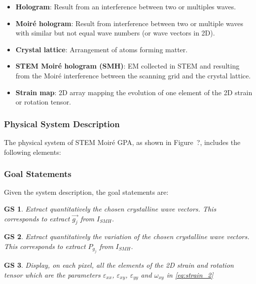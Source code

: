 \documentclass[12pt]{article}
\newcommand{\progname}{STEM Moir{\'e} GPA}
\newtheorem{GS}{GS}
\begin{document}
\begin{itemize}
\item \textbf{Hologram}: Result from an interference between two or multiples waves. 
\item \textbf{Moir{\'e} hologram}: Result from interference between two or multiple waves with similar but not equal wave numbers (or wave vectors in 2D).
\item \textbf{Crystal lattice}: Arrangement of atoms forming matter.
\item \textbf{STEM Moir{\'e} hologram (SMH)}: EM collected in STEM and resulting from the 
Moir{\'e} interference between the scanning grid and the crystal lattice. 
\item \textbf{Strain map}: 2D array mapping the evolution of one element of the 2D strain or rotation 
tensor. 
\end{itemize}

\subsubsection{Physical System Description}

The physical system of \progname{}, as shown in Figure~?,
includes the following elements:





\subsubsection{Goal Statements}

\noindent Given the system description, the goal statements are:
\begin{GS}
\normalfont Extract quantitatively the chosen crystalline wave vectors. This corresponds to extract $\vec{g_{j}}$ from $I_{SMH}$.
\label{GS_1}
\end{GS}
\begin{GS}
\normalfont Extract quantitatively the variation of the chosen crystalline wave vectors. This corresponds to extract $P_{g_{j}}$ from $I_{SMH}$.
\label{GS_2}
\end{GS}
\begin{GS}
\normalfont Display, on each pixel, all the elements of the 2D strain and rotation tensor which are the parameters $\varepsilon_{xx}$, $\varepsilon_{xy}$, $\varepsilon_{yy}$ and $\omega_{xy}$ in \cref{eq:strain_2}
\label{GS_3}
\end{GS}
\end{document}
